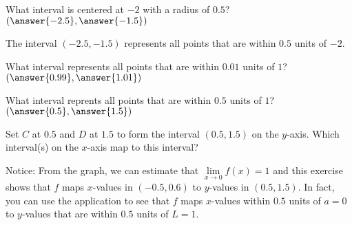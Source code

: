 \documentclass{ximera}
\begin{document}
\begin{exercise}
    \begin{question}
    	What interval is centered at $-2$ with a radius of $ 0.5$? $\left( \answer{-2.5}, \answer{-1.5}\right)$
    	\begin{feedback}
    		The interval $(-2.5, -1.5)$ represents all points that are within $0.5$ units of $-2$.
    	\end{feedback}
    \end{question}
    \begin{question}
    	What interval represents all points that are within $0.01$ units of $1$?  $\left( \answer{0.99}, \answer{1.01} \right)$
    \end{question}
 	\begin{question}
 		What interval reprents all points that are within $0.5$ units of $1$?  $\left( \answer{0.5}, \answer{1.5}\right)$
 		\begin{question}
 			Set $C$ at $0.5$ and $D$ at $1.5$ to form the interval $(0.5, 1.5)$ on the $y$-axis.  Which interval(s) on the $x$-axis map to this interval?
 			\begin{selectAll}}
 				\choice{$(-1, 1)$}
 				\choice[correct]{$(-0.5, 0.6)$}
 				\choice[correct]{$(-3.75, -3.1)$}
 				\choice[corrct]{$(5.23, 5.65)$}
 			\end{selectAll}
 		    \begin{feedback}
 		    	Notice: From the graph, we can estimate that $\lim\limits_{x \to 0}f(x)=1$ and this exercise shows that $f$ maps $x$-values in $(-0.5, 0.6)$ to $y$-values in $(0.5, 1.5)$.  In fact, you can use the application to see that $f$ maps $x$-values within $0.5$ units of $a=0$ to $y$-values that are within $0.5$ units of $L=1$.
 		    \end{feedback}
  		\end{question}	
 	\end{question}
    \end{exercise}
\end{document}
